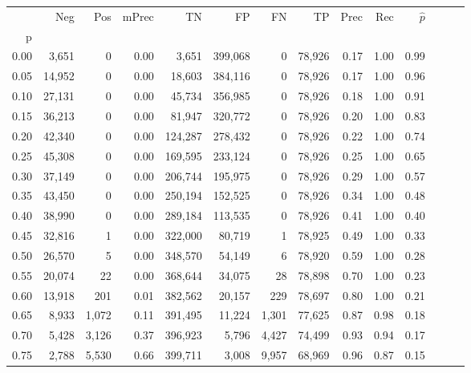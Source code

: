 \begin{tabular}{rrrrrrrrrrrrrr}
\toprule
{} &     Neg &     Pos & mPrec &       TN &       FP &      FN &      TP &  Prec &   Rec & $\hat{p}$ \\
p    &         &         &       &          &          &         &         &       &       &           \\
\midrule
0.00 &   3,651 &       0 &  0.00 &    3,651 &  399,068 &       0 &  78,926 &  0.17 &  1.00 &      0.99 \\
0.05 &  14,952 &       0 &  0.00 &   18,603 &  384,116 &       0 &  78,926 &  0.17 &  1.00 &      0.96 \\
0.10 &  27,131 &       0 &  0.00 &   45,734 &  356,985 &       0 &  78,926 &  0.18 &  1.00 &      0.91 \\
0.15 &  36,213 &       0 &  0.00 &   81,947 &  320,772 &       0 &  78,926 &  0.20 &  1.00 &      0.83 \\
0.20 &  42,340 &       0 &  0.00 &  124,287 &  278,432 &       0 &  78,926 &  0.22 &  1.00 &      0.74 \\
0.25 &  45,308 &       0 &  0.00 &  169,595 &  233,124 &       0 &  78,926 &  0.25 &  1.00 &      0.65 \\
0.30 &  37,149 &       0 &  0.00 &  206,744 &  195,975 &       0 &  78,926 &  0.29 &  1.00 &      0.57 \\
0.35 &  43,450 &       0 &  0.00 &  250,194 &  152,525 &       0 &  78,926 &  0.34 &  1.00 &      0.48 \\
0.40 &  38,990 &       0 &  0.00 &  289,184 &  113,535 &       0 &  78,926 &  0.41 &  1.00 &      0.40 \\
0.45 &  32,816 &       1 &  0.00 &  322,000 &   80,719 &       1 &  78,925 &  0.49 &  1.00 &      0.33 \\
0.50 &  26,570 &       5 &  0.00 &  348,570 &   54,149 &       6 &  78,920 &  0.59 &  1.00 &      0.28 \\
0.55 &  20,074 &      22 &  0.00 &  368,644 &   34,075 &      28 &  78,898 &  0.70 &  1.00 &      0.23 \\
0.60 &  13,918 &     201 &  0.01 &  382,562 &   20,157 &     229 &  78,697 &  0.80 &  1.00 &      0.21 \\
0.65 &   8,933 &   1,072 &  0.11 &  391,495 &   11,224 &   1,301 &  77,625 &  0.87 &  0.98 &      0.18 \\
0.70 &   5,428 &   3,126 &  0.37 &  396,923 &    5,796 &   4,427 &  74,499 &  0.93 &  0.94 &      0.17 \\
0.75 &   2,788 &   5,530 &  0.66 &  399,711 &    3,008 &   9,957 &  68,969 &  0.96 &  0.87 &      0.15 \\

\end{tabular}
